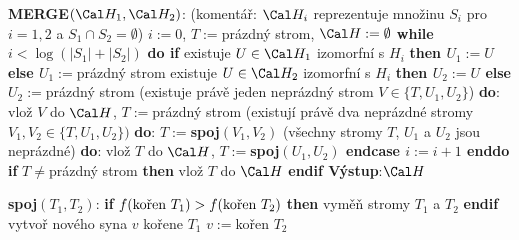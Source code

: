 \documentclass[a4paper,12pt]{article}
\begin{document}
{\bf MERGE$(\Cal H_1,\Cal H_2)$}:\newline 
(komentář: $\Cal H_i$ reprezentuje množinu $S_i$ pro $i=1
,2$ a $S_1\cap S_2=\emptyset$)\newline 
$i:=0$, $T:=$prázdný strom, $\Cal H:=\emptyset$\newline 
{\bf while} $i<\log(|S_1|+|S_2|)$ {\bf do\newline 
\phantom{{\rm ---}}if} existuje $U\in \Cal H_1$ izomorfní s $
H_i$ {\bf then\newline 
\phantom{{\rm ------}}$U_1:=U$\newline 
\phantom{{\rm ---}}else\newline 
\phantom{{\rm ------}}$U_1:=$}prázdný strom\newline 
{} existuje $U\in \Cal H_2$ izomorfní s $
H_i$ {\bf then\newline 
\phantom{{\rm ------}}$U_2:=U$\newline 
\phantom{{\rm ---}}else\newline 
\phantom{{\rm ------}}$U_2:=$}prázdný strom\newline 
{}(existuje právě jeden neprázdný strom 
$V\in \{T,U_1,U_2\}$) {\bf do}:\newline 
\phantom{---------}vlož $V$ do $\Cal H$, $T:=$prázdný strom\newline 
\phantom{------}(existují právě dva neprázdné stromy 
$V_1,V_2\in \{T,U_1,U_2\})$ {\bf do}:\newline 
\phantom{---------}$T:=${\bf spoj$(V_1,V_2)$\newline 
\phantom{{\rm ------}}}(všechny stromy $T$, $U_1$ a $U_2$ jsou neprázdné) {\bf do}:\newline 
\phantom{---------}vlož $T$ do $\Cal H$, $T:=${\bf spoj$(U_1,U_
2)$\newline 
\phantom{{\rm ---}}endcase\newline 
\phantom{{\rm ---}}$i:=i+1$\newline 
enddo\newline 
if} $T\ne$prázdný strom {\bf then} vlož $T$ do $\Cal H$ {\bf endif\newline 
Výstup}:$\Cal H$

{\bf spoj$(T_1,T_2)$}:\newline 
{\bf if} $f(\text{\rm kořen }T_1)>f(\text{\rm kořen }T_2)$ {\bf then\newline 
\phantom{{\rm ---}}}vyměň stromy $T_1$ a $T_2$\newline 
{\bf endif\newline 
}
vytvoř nového  syna $v$ kořene $T_1$\newline 
$v:=$kořen $T_2$
\end{document}
